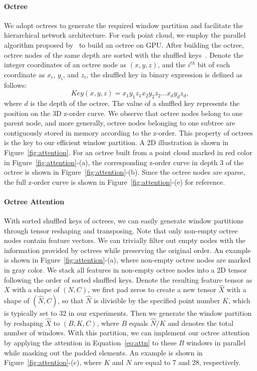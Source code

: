 \documentclass[acmtog,screen,authorversion]{acmart}
\begin{document}
\paragraph{Octree}
We adopt octrees to generate the required window partition and facilitate the hierarchical network architecture.
For each point cloud, we employ the parallel algorithm proposed by~\cite{Zhou2011} to build an octree on GPU.
After building the octree, octree nodes of the same depth are sorted with the shuffled keys~\cite{Wilhelms1992}.
Denote the integer coordinates of an octree node as $(x, y, z)$, and the $i^{th}$ bit of each coordinate as $x_i$, $y_i$, and $z_i$, the shuffled key in binary expression is defined as follows:
\begin{equation}
  Key(x, y, z)=x_1 y_1 z_1 x_2 y_2 z_2 \dots x_d y_d z_d ,
\end{equation}
where $d$ is the depth of the octree.
The value of a shuffled key represents the position on the 3D z-order curve.
We observe that octree nodes belong to one parent node, and more generally, octree nodes belonging to one subtree are contiguously stored in memory according to the z-order.
This property of octrees is the key to our efficient window partition.
A 2D illustration is shown in Figure~\ref{fig:attention}.
For an octree built from a point cloud marked in red color in Figure~\ref{fig:attention}-(a), the corresponding z-order curve in depth 3 of the octree is shown in Figure~\ref{fig:attention}-(b).
Since the octree nodes are sparse, the full z-order curve is shown in Figure~\ref{fig:attention}-(e) for reference.


\paragraph{Octree Attention}
With sorted shuffled keys of octrees, we can easily generate window partitions through tensor reshaping and transposing.
Note that only non-empty octree nodes contain feature vectors.
We can trivially filter out empty nodes with the information provided by octrees while preserving the original order.
An example is shown in Figure~\ref{fig:attention}-(a), where non-empty octree nodes are marked in gray color.
We stack all features in non-empty octree nodes into a 2D tensor following the order of sorted shuffled keys.
Denote the resulting feature tensor as $X$ with a shape of $(N, C)$, we first pad zeros to create a new tensor $\hat{X}$ with a shape of $(\hat{N}, C)$, so that $\hat{N}$ is divisible by the specified point number $K$, which is typically set to 32 in our experiments.
Then we generate the window partition by reshaping $\hat{X}$ to $(B, K, C)$, where $B$ equals $\hat{N} / K$ and denotes the total number of windows.
With this partition, we can implement our octree attention by applying the attention in Equation~\ref{eq:attn} to these $B$ windows in parallel while masking out the padded elements.
An example is shown in Figure~\ref{fig:attention}-(c), where $K$ and $N$ are equal to 7 and 28, respectively.
\end{document}
